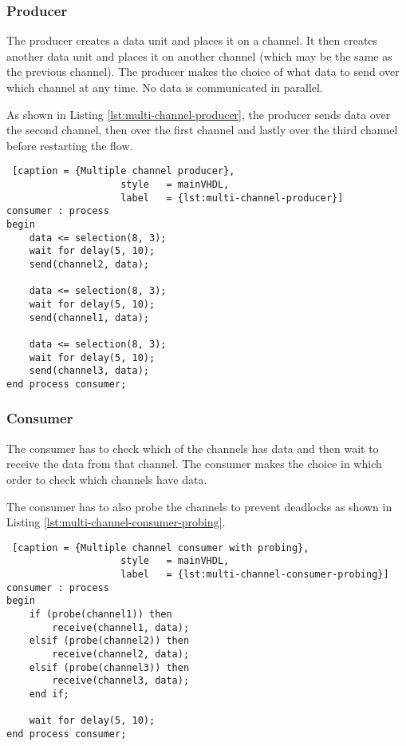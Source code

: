 \documentclass{report}
\begin{document}
\subsubsection{Producer}

The producer creates a data unit and places it on a channel. It then creates
another data unit and places it on another channel (which may be the same as the
previous channel). The producer makes the choice of what data to send over which
channel at any time. No data is communicated in parallel.

As shown in Listing \ref{lst:multi-channel-producer}, the producer sends data
over the second channel, then over the first channel and lastly over the third
channel before restarting the flow.

\begin{lstlisting} [caption = {Multiple channel producer},
                    style   = mainVHDL,
                    label   = {lst:multi-channel-producer}]
consumer : process
begin
    data <= selection(8, 3);
    wait for delay(5, 10);
    send(channel2, data);

    data <= selection(8, 3);
    wait for delay(5, 10);
    send(channel1, data);

    data <= selection(8, 3);
    wait for delay(5, 10);
    send(channel3, data);
end process consumer;

\end{lstlisting}

\subsubsection{Consumer}

The consumer has to check which of the channels has data and then wait to
receive the data from that channel. The consumer makes the choice in which order
to check which channels have data.

The consumer has to also probe the channels to prevent deadlocks as shown in
Listing \ref{lst:multi-channel-consumer-probing}.

\begin{lstlisting} [caption = {Multiple channel consumer with probing},
                    style   = mainVHDL,
                    label   = {lst:multi-channel-consumer-probing}]
consumer : process
begin
    if (probe(channel1)) then
        receive(channel1, data);
    elsif (probe(channel2)) then
        receive(channel2, data);
    elsif (probe(channel3)) then
        receive(channel3, data);
    end if;

    wait for delay(5, 10);
end process consumer;

\end{lstlisting}
\end{document}
